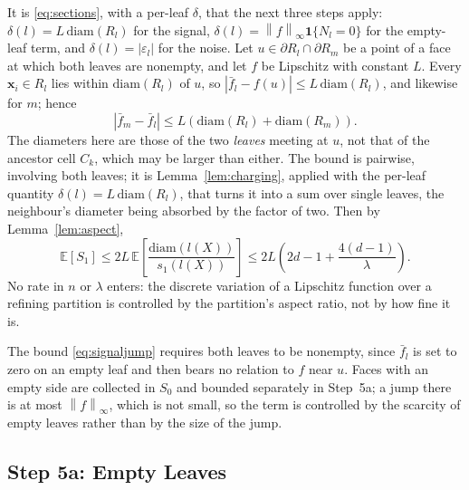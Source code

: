 \documentclass[12pt,a4paper]{article}
\numberwithin{equation}{section}
\theoremstyle{plain}
\theoremstyle{definition}
\newcommand{\norm}[1]{\left\| #1 \right\|}
\newcommand{\E}{\mathbb{E}}
\newcommand{\abs}[1]{\left| #1 \right|}
\begin{document}
	It is \eqref{eq:sections}, with a per-leaf $\delta$, that the next three
	steps apply: $\delta(l) = L\,\mathrm{diam}(R_l)$ for the signal,
	$\delta(l) = \norm{f}_\infty \mathbf{1}\{N_l = 0\}$ for the empty-leaf term,
	and $\delta(l) = \abs{\varepsilon_l}$ for the noise.
Let $u \in \partial R_l \cap \partial R_m$ be a point of a face at which both
	leaves are nonempty, and let $f$ be Lipschitz with constant $L$. Every
	$\mathbf{x}_i \in R_l$ lies within $\mathrm{diam}(R_l)$ of $u$, so
	$|\bar{f}_l - f(u)| \leq L\,\mathrm{diam}(R_l)$, and likewise for $m$;
	hence
	\begin{equation}
		\abs{\bar{f}_m - \bar{f}_l}
		\leq L\left(\mathrm{diam}(R_l) + \mathrm{diam}(R_m)\right).
		\label{eq:signaljump}
	\end{equation}
	The diameters here are those of the two \emph{leaves} meeting at $u$, not
	that of the ancestor cell $C_k$, which may be larger than either. The bound
	is pairwise, involving both leaves; it is Lemma~\ref{lem:charging}, applied
	with the per-leaf quantity $\delta(l) = L\,\mathrm{diam}(R_l)$, that turns
	it into a sum over single leaves, the neighbour's diameter being absorbed by
	the factor of two. Then by Lemma~\ref{lem:aspect},
	\begin{equation}
		\E[S_1] \leq 2L\,
		\E\!\left[\frac{\mathrm{diam}(l(X))}{s_1(l(X))}\right]
		\leq 2L\left(2d - 1 + \frac{4(d-1)}{\lambda}\right).
	\end{equation}
	No rate in $n$ or $\lambda$ enters: the discrete variation of a Lipschitz
	function over a refining partition is controlled by the partition's aspect
	ratio, not by how fine it is.

	The bound \eqref{eq:signaljump} requires both leaves to be nonempty, since
	$\bar{f}_l$ is set to zero on an empty leaf and then bears no relation to
	$f$ near $u$. Faces with an empty side are collected in $S_0$ and bounded
	separately in Step~5a; a jump there is at most $\norm{f}_\infty$, which is
	not small, so the term is controlled by the scarcity of empty leaves rather
	than by the size of the jump.

	\subsection{Step 5a: Empty Leaves}
\end{document}
